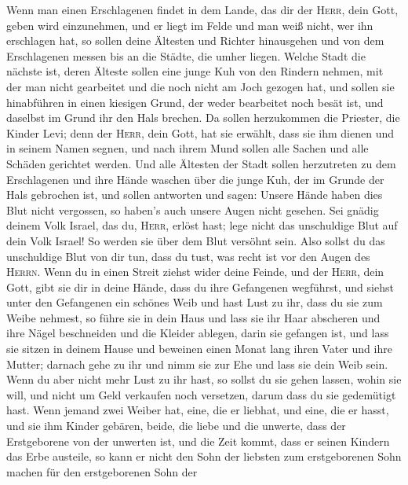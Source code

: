  Wenn man einen Erschlagenen findet in dem Lande, das dir
der \textsc{Herr}, dein Gott, geben wird einzunehmen, und er liegt im
Felde und man weiß nicht, wer ihn erschlagen hat,  so
sollen deine Ältesten und Richter hinausgehen und von dem Erschlagenen
messen bis an die Städte, die umher liegen.  Welche Stadt
die nächste ist, deren Älteste sollen eine junge Kuh von den Rindern
nehmen, mit der man nicht gearbeitet und die noch nicht am Joch gezogen
hat,  und sollen sie hinabführen in einen kiesigen Grund,
der weder bearbeitet noch besät ist, und daselbst im Grund ihr den Hals
brechen.  Da sollen herzukommen die Priester, die Kinder
Levi; denn der \textsc{Herr}, dein Gott, hat sie erwählt, dass sie ihm
dienen und in seinem Namen segnen, und nach ihrem Mund sollen alle
Sachen und alle Schäden gerichtet werden.  Und alle
Ältesten der Stadt sollen herzutreten zu dem Erschlagenen und ihre Hände
waschen über die junge Kuh, der im Grunde der Hals gebrochen ist,
 und sollen antworten und sagen: Unsere Hände haben dies
Blut nicht vergossen, so haben's auch unsere Augen nicht gesehen.
 Sei gnädig deinem Volk Israel, das du, \textsc{Herr},
erlöst hast; lege nicht das unschuldige Blut auf dein Volk Israel! So
werden sie über dem Blut versöhnt sein.  Also sollst du
das unschuldige Blut von dir tun, dass du tust, was recht ist vor den
Augen des \textsc{Herrn}.  Wenn du in einen Streit ziehst
wider deine Feinde, und der \textsc{Herr}, dein Gott, gibt sie dir in
deine Hände, dass du ihre Gefangenen wegführst,  und
siehst unter den Gefangenen ein schönes Weib und hast Lust zu ihr, dass
du sie zum Weibe nehmest,  so führe sie in dein Haus und
lass sie ihr Haar abscheren und ihre Nägel beschneiden 
und die Kleider ablegen, darin sie gefangen ist, und lass sie sitzen in
deinem Hause und beweinen einen Monat lang ihren Vater und ihre Mutter;
darnach gehe zu ihr und nimm sie zur Ehe und lass sie dein Weib sein.
 Wenn du aber nicht mehr Lust zu ihr hast, so sollst du
sie gehen lassen, wohin sie will, und nicht um Geld verkaufen noch
versetzen, darum dass du sie gedemütigt hast.  Wenn
jemand zwei Weiber hat, eine, die er liebhat, und eine, die er hasst,
und sie ihm Kinder gebären, beide, die liebe und die unwerte, dass der
Erstgeborene von der unwerten ist,  und die Zeit kommt,
dass er seinen Kindern das Erbe austeile, so kann er nicht den Sohn der
liebsten zum erstgeborenen Sohn machen für den erstgeborenen Sohn der
